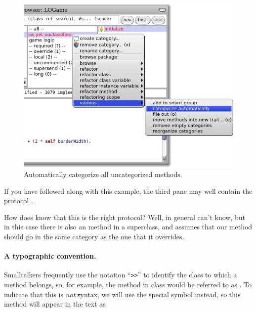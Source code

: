 \documentclass[a4paper,10pt,twoside]{book}
\begin{document}
\begin{figure}[htbp]
   \centering
   \includegraphics[width=\textwidth]{Categorize} 
   \caption{Automatically categorize all uncategorized methods.}
\end{figure}

If you have followed along with this example, the third pane may well contain the protocol .

How does \pharo{} know that this is the right protocol?  Well, in general \pharo{} can't know, but in this case there is also an  method in a superclass, and \pharo assumes that our  method should go in the same category as the one that it overrides.


\paragraph{A typographic convention.} Smalltalkers frequently use the notation ``\verb|>>|'' to identify the class to which a method belongs, so, for example, the  method in class  would be referred to as .
To indicate that this is \emph{not} \st syntax, we will use the special symbol \ct{>>>} instead, so this method will appear in the text as 
\end{document}
